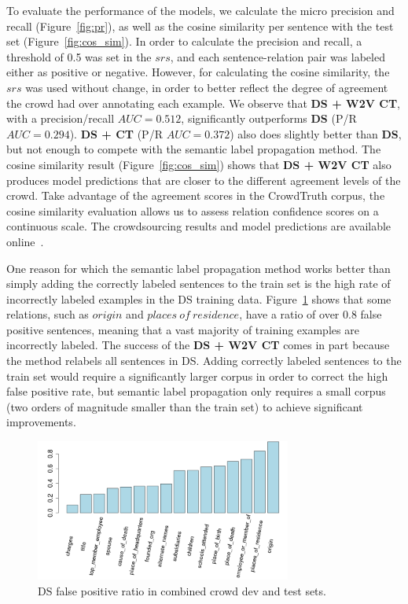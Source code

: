 To evaluate the performance of the models, we calculate the micro precision and recall (Figure~\ref{fig:pr}), as well as the cosine similarity per sentence with the test set (Figure~\ref{fig:cos_sim}).  In order to calculate the precision and recall, a threshold of 0.5 was set in the $srs$, and each sentence-relation pair was labeled either as positive or negative. However, for calculating the cosine similarity, the $srs$ was used without change, in order to better reflect the degree of agreement the crowd had over annotating each example.  We observe that \textbf{DS + W2V CT}, with a precision/recall $AUC = 0.512$, significantly outperforms \textbf{DS} (P/R $AUC = 0.294$). \textbf{DS + CT} (P/R $AUC = 0.372$) also does slightly better than \textbf{DS}, but not enough to compete with the semantic label propagation method. The cosine similarity result (Figure~\ref{fig:cos_sim}) shows that \textbf{DS + W2V CT} also produces model predictions that are closer to the different agreement levels of the crowd. Take advantage of the agreement scores in the CrowdTruth corpus, the cosine similarity evaluation allows us to assess relation confidence scores on a continuous scale. The crowdsourcing results and model predictions are available online~\cite{crowdODrelexdata2016}.

One reason for which the semantic label propagation method works better than simply adding the correctly labeled sentences to the train set is the high rate of incorrectly labeled examples in the DS training data. Figure~\ref{fig:fp} shows that some relations, such as $origin$ and $places\ of\ residence$, have a ratio of over 0.8 false positive sentences, meaning that a vast majority of training examples are incorrectly labeled.  The success of the \textbf{DS + W2V CT} comes in part because the method relabels all sentences in DS. Adding correctly labeled sentences to the train set would require a significantly larger corpus in order to correct the high false positive rate, but semantic label propagation only requires a small corpus (two orders of magnitude smaller than the train set) to achieve significant improvements.

\begin{figure}[tbh!]
\centering
\caption{DS false positive ratio in combined crowd dev and test sets.}
\label{fig:fp}
\includegraphics[width=0.75\textwidth]{img/fp.png}
\end{figure}

